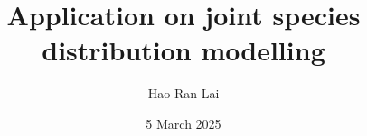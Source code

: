 \documentclass[12pt]{beamer}
\author{Hao Ran Lai}
\title{Application on joint species distribution modelling}
\date{5 March 2025}
\begin{document}
\begin{frame}
\titlepage
\end{frame}
\end{document}
